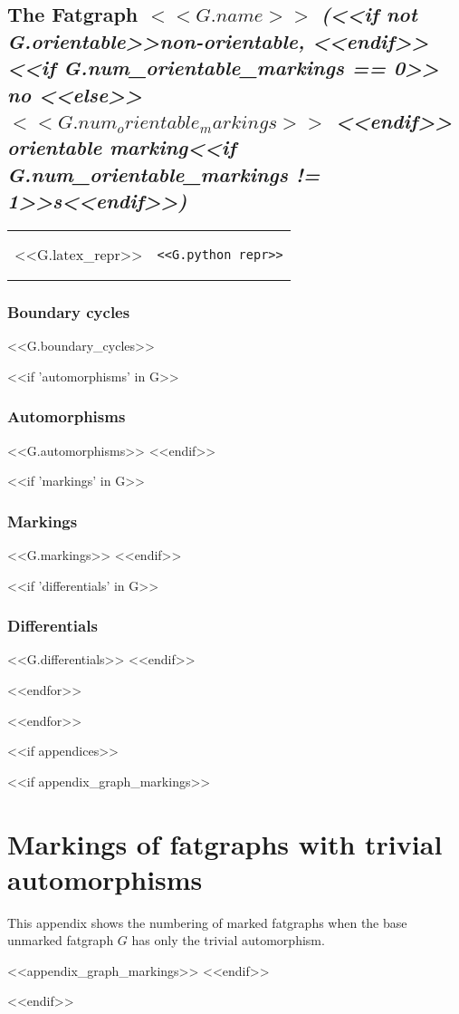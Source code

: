 \documentclass[a4paper]{article}
\begin{document}
\subsection{The Fatgraph $<<G.name>>$ %
  {\em (<<if not G.orientable>>non-orientable, <<endif>>%
    <<if G.num_orientable_markings == 0>>%
      no
    <<else>>%
      $<<G.num_orientable_markings>>$
    <<endif>> %
    orientable marking<<if G.num_orientable_markings != 1>>s<<endif>>)}}%
\vspace{-1em}
\begin{tabular}{lr}
  \begin{minipage}{0.45\textwidth}
  {%
\hspace{-3em}
<<G.latex_repr>>
  }%
  \end{minipage}
  &%
  \begin{minipage}{0.45\textwidth}
\begin{verbatim}
<<G.python_repr>>
\end{verbatim}
  \end{minipage}
\end{tabular}
\vspace{-2em}

\subsubsection{Boundary cycles}
<<G.boundary_cycles>>

<<if 'automorphisms' in G>>
\subsubsection{Automorphisms}
<<G.automorphisms>>
<<endif>>

<<if 'markings' in G>>
\subsubsection{Markings}
<<G.markings>>
<<endif>>

<<if 'differentials' in G>>
\subsubsection{Differentials}
<<G.differentials>>
<<endif>>

<<endfor>>%


<<endfor>>%


<<if appendices>>
\appendix

<<if appendix_graph_markings>>
\section{Markings of fatgraphs with trivial automorphisms}
\label{appendix:markings}

This appendix shows the numbering of marked fatgraphs when the base
unmarked fatgraph $G$ has only the trivial automorphism.

<<appendix_graph_markings>>
<<endif>>%

<<endif>>%
\end{document}
